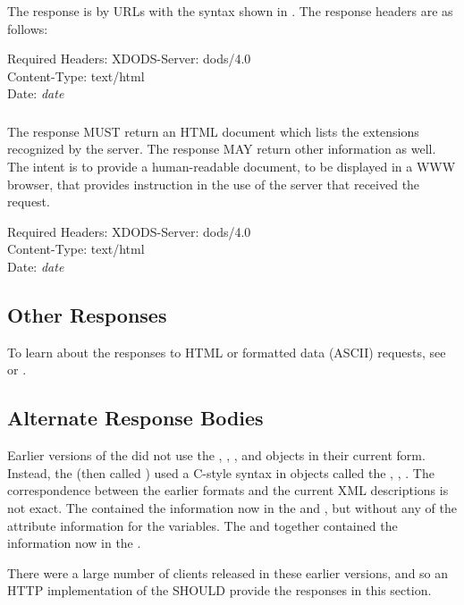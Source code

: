 \documentclass[justify]{dods-paper}
\begin{document}
The \INFO response is by URLs with the syntax shown in
.  The response headers are as follows:

\begin{textoutput}{Required Headers:}
XDODS-Server: dods/4.0\\
Content-Type: text/html\\
Date: \emph{date}
\end{textoutput}


\subsubsection{\HELP}

The \HELP response MUST return an HTML document which lists the
extensions recognized by the server.  The response MAY return other
information as well.  The intent is to provide a human-readable
document, to be displayed in a WWW browser, that provides instruction
in the use of the server that received the request.

\begin{textoutput}{Required Headers:}
XDODS-Server: dods/4.0\\
Content-Type: text/html\\
Date: \emph{date}
\end{textoutput}


\subsection{Other Responses}

To learn about the responses to HTML or formatted data (ASCII)
requests, see \DAPHTML or \DAPASCII. 


\subsection{Alternate Response Bodies}
\label{sec-resp-alt}

Earlier versions of the \DAP did not use the \DDX, \DAX, \Blob, and
\ErrorX objects in their current form.  Instead, the \DAP (then called
\DODS) used a C-style syntax in objects called the \DDS, \DAS,
\DataDDS.  The correspondence between the earlier formats and the
current XML descriptions is not exact.  The \DataDDS contained the
information now in the \DDX and \Blob, but without any of the
attribute information for the variables.  The \DDS and \DAS together
contained the information now in the \DAX.

There were a large number of \DAP clients released in these earlier
versions, and so an HTTP implementation of the \DAP SHOULD provide the
responses in this section.
\end{document}
